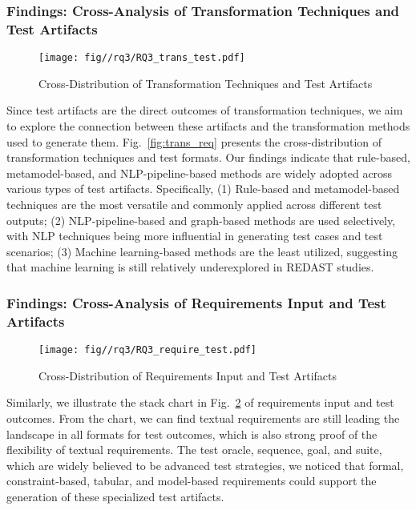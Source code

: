 \subsubsection{Findings: Cross-Analysis of Transformation Techniques and Test Artifacts}

\begin{figure}
    \centering
    \texttt{[image: fig//rq3/RQ3\_trans\_test.pdf]}
    \caption{Cross-Distribution of Transformation Techniques and Test Artifacts}
    \label{fig:trans_test}
\end{figure}
Since test artifacts are the direct outcomes of transformation techniques, we aim to explore the connection between these artifacts and the transformation methods used to generate them. Fig.~\ref{fig:trans_req} presents the cross-distribution of transformation techniques and test formats. Our findings indicate that rule-based, metamodel-based, and NLP-pipeline-based methods are widely adopted across various types of test artifacts. Specifically, (1) Rule-based and metamodel-based techniques are the most versatile and commonly applied across different test outputs; (2) NLP-pipeline-based and graph-based methods are used selectively, with NLP techniques being more influential in generating test cases and test scenarios; (3) Machine learning-based methods are the least utilized, suggesting that machine learning is still relatively underexplored in REDAST studies.

\subsubsection{Findings: Cross-Analysis of Requirements Input and Test Artifacts}
\begin{figure}
    \centering
    \texttt{[image: fig//rq3/RQ3\_require\_test.pdf]}
    \caption{Cross-Distribution of Requirements Input and Test Artifacts}
    \label{fig:require_test}
\end{figure}

Similarly, we illustrate the stack chart in Fig.~\ref{fig:require_test} of requirements input and test outcomes. From the chart, we can find textual requirements are still leading the landscape in all formats for test outcomes, which is also strong proof of the flexibility of textual requirements. The test oracle, sequence, goal, and suite, which are widely believed to be advanced test strategies, we noticed that formal, constraint-based, tabular, and model-based requirements could support the generation of these specialized test artifacts.


